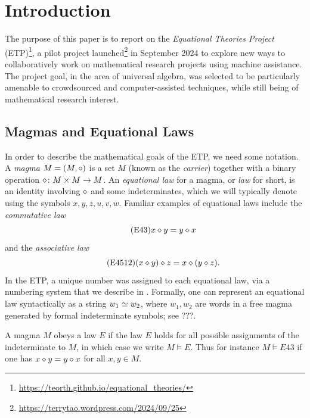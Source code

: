 \section{Introduction}

The purpose of this paper is to report on the \emph{Equational Theories Project} (ETP)\footnote{\url{https://teorth.github.io/equational_theories/}}, a pilot project launched\footnote{\url{https://terrytao.wordpress.com/2024/09/25}} in September 2024 to explore new ways to collaboratively work on mathematical research projects using machine assistance. The project goal, in the area of universal algebra, was selected to be particularly amenable to crowdsourced and computer-assisted techniques, while still being of mathematical research interest. 

\subsection{Magmas and Equational Laws}

In order to describe the mathematical goals of the ETP, we need some notation. A \emph{magma} $M = (M,\diamond)$ is a set $M$ (known as the \emph{carrier}) together with a binary operation $\diamond \colon M \times M \to M$. An \emph{equational law} for a magma, or \emph{law} for short, is an identity involving $\diamond$ and some indeterminates, which we will typically denote using the symbols $x,y,z,u,v,w$. Familiar examples of equational laws include the \emph{commutative law}
\begin{equation}\label{eq43}\tag{E43}
    x \diamond y = y \diamond x
\end{equation}
and the \emph{associative law}
\begin{equation}\label{eq4512}\tag{E4512}
    (x \diamond y) \diamond z = x \diamond (y \diamond z).
\end{equation}
In the ETP, a unique number was assigned to each equational law, via a numbering system that we describe in . Formally, one can represent an equational law syntactically as a string $w_1 \simeq w_2$, where $w_1, w_2$ are words in a free magma generated by formal indeterminate symbols; see ???.

A magma $M$ obeys a law $E$ if the law $E$ holds for all possible assignments of the indeterminate to $M$, in which case we write $M \models E$. Thus for instance $M \models E43$ if one has $x \diamond y = y \diamond x$ for all $x,y \in M$.

